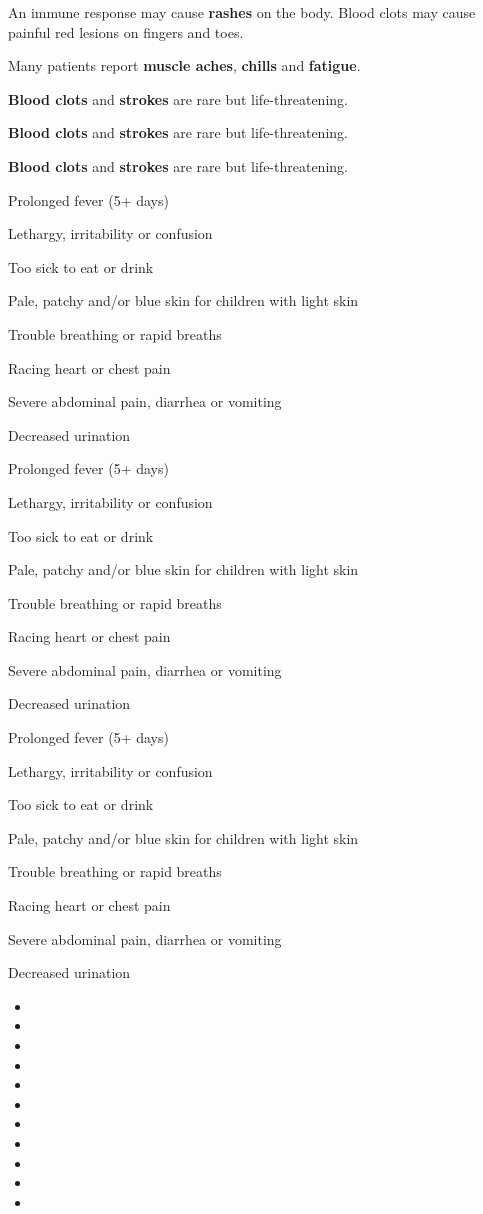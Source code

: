 An immune response may cause \textbf{rashes} on the body. Blood clots
may cause painful red lesions on fingers and toes.

Many patients report \textbf{muscle aches}, \textbf{chills} and
\textbf{fatigue}.

\textbf{Blood clots} and \textbf{strokes} are rare but life-threatening.

\textbf{Blood clots} and \textbf{strokes} are rare but life-threatening.

\textbf{Blood clots} and \textbf{strokes} are rare but life-threatening.

Prolonged fever (5+ days)

Lethargy, irritability or confusion

Too sick to eat or drink

Pale, patchy and/or blue skin for children with light skin

Trouble breathing or rapid breaths

Racing heart or chest pain

Severe abdominal pain, diarrhea or vomiting

Decreased urination

Prolonged fever (5+ days)

Lethargy, irritability or confusion

Too sick to eat or drink

Pale, patchy and/or blue skin for children with light skin

Trouble breathing or rapid breaths

Racing heart or chest pain

Severe abdominal pain, diarrhea or vomiting

Decreased urination

Prolonged fever (5+ days)

Lethargy, irritability or confusion

Too sick to eat or drink

Pale, patchy and/or blue skin for children with light skin

Trouble breathing or rapid breaths

Racing heart or chest pain

Severe abdominal pain, diarrhea or vomiting

Decreased urination

\begin{itemize}
\item
\item
\item
\item
\item
\item
\item
\item
\item
\item
\item
\end{itemize}

